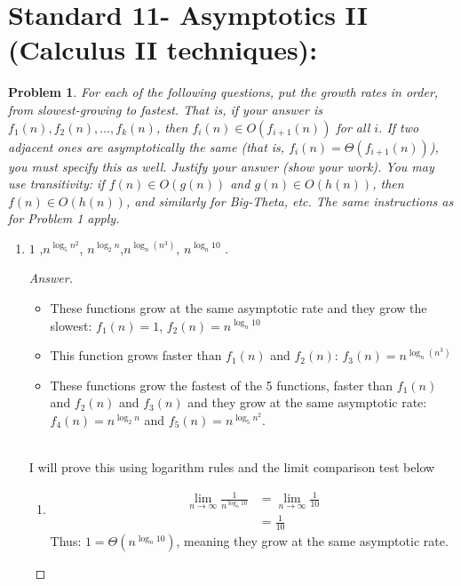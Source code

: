 \documentclass[11pt]{article}
\theoremstyle{definition}
\theoremstyle{definition}
\newtheorem{required}{Problem}
\theoremstyle{definition}
\begin{document}
\section{Standard 11- Asymptotics II (Calculus II techniques): }
\begin{required}



    {\itshape For each of the following questions, put the growth rates in order, from slowest-growing to fastest. That is, if your answer is $f_1(n), f_2(n), \dotsc, f_k(n)$, then $f_i(n) \in O(f_{i+1}(n))$ for all $i$. If two adjacent ones are asymptotically the same (that is, $f_i(n) = \Theta(f_{i+1}(n))$), you must specify this as well. 
    Justify your answer (show your work). You may use transitivity: if $f(n) \in O(g(n))$ and $g(n) \in O(h(n))$, then $f(n) \in O(h(n))$, and similarly for Big-Theta, etc. The same instructions as for Problem 1 apply.}
    \begin{enumerate}[label=(\alph*)]
\subsection{Problem 3\ref{2a}}
        \item \label{2a} $1$ ,\qquad $n^{\log_5 n^2}$, \qquad $n^{\log_2 n}$,\qquad  $n^{\log_n(n^3)}$, \qquad $ n^{\log_n 10}$ .



        \begin{proof}[Answer]

\begin{itemize}
\item These functions grow at the same asymptotic rate and they grow the slowest: $f_{1}(n)= 1$, $f_{2}(n)= n^{\log_n 10}$
\item This function grows faster than $f_{1}(n)$ and $f_{2}(n)$:  $f_{3}(n)=n^{\log_n(n^3)}$
\item These functions grow the fastest of the 5 functions, faster than $f_{1}(n)$ and $f_{2}(n)$ and $f_{3}(n)$ and they grow at the same asymptotic rate: $f_{4}(n)=n^{\log_2 n}$ and $f_{5}(n)=n^{\log_5 n^2}$.
\end{itemize}


\noindent \\ I will prove this using logarithm rules and the limit comparison test below
\begin{enumerate}

\item
\begin{align*}
\lim_{n \to \infty} \frac{1}{n^{\log_n 10}} 
&=\lim_{n \to \infty} \frac{1}{10} \\
&= \frac{1}{10} 
\end{align*}
Thus: $1= \Theta(n^{\log_n 10})$, meaning they grow at the same asymptotic rate.


\end{enumerate}
\end{proof}
\end{enumerate}
\end{required}
\end{document}
